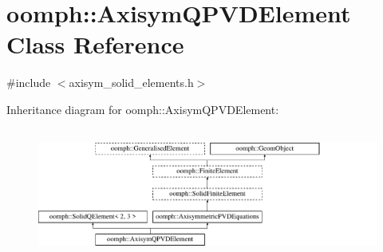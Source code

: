 \hypertarget{classoomph_1_1AxisymQPVDElement}{}\section{oomph\+:\+:Axisym\+Q\+P\+V\+D\+Element Class Reference}
\label{classoomph_1_1AxisymQPVDElement}


{\ttfamily \#include $<$axisym\+\_\+solid\+\_\+elements.\+h$>$}

Inheritance diagram for oomph\+:\+:Axisym\+Q\+P\+V\+D\+Element\+:\begin{figure}[H]
\begin{center}
\leavevmode
\includegraphics[height=4.301075cm]{classoomph_1_1AxisymQPVDElement}
\end{center}
\end{figure}
